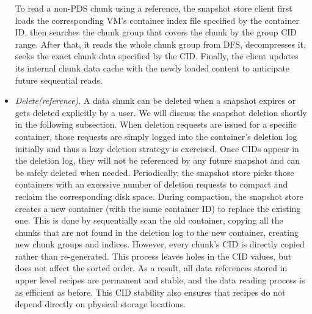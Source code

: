 \begin{itemize}
To read a non-PDS chunk using a reference,  the snapshot store client first loads the
corresponding VM's container index file specified by the container ID, then searches the chunk
group  that  covers the chunk by the group  CID range.
After that, it reads the whole chunk group from DFS, decompresses it, seeks the exact chunk data 
specified by the CID. 
Finally, the client updates its internal chunk data cache with the newly loaded content to 
anticipate future sequential reads.
\item {\em Delete(reference)}.
A data chunk can be deleted when a snapshot expires or gets deleted explicitly by a user.
We will discuss the snapshot deletion shortly in the following subsection.
When deletion requests are issued for a specific container,
those requests are simply logged into the  container's deletion log initially and thus  a lazy
deletion strategy is exercised.
Once CIDs appear in
the deletion log, they will not be referenced by any future snapshot and can be safely deleted when needed. 
Periodically, the snapshot  store picks those containers with an excessive
number of deletion requests to  compact and  reclaim the corresponding disk space. 
During compaction, the snapshot store creates a new container (with the same container ID) to replace the 
existing one. This is done by sequentially scan the old container, copying all the chunks that are not 
found in the deletion log to the new container, creating new chunk groups and indices. 
However, every chunk's CID is directly copied rather than re-generated. This
process leaves holes in the CID values, but does not affect the sorted order.
As a result, all data references stored 
in upper level recipes are permanent and stable, and the data reading process
is as efficient as before. This CID stability also ensures that recipes do not
depend directly on physical storage locations.
\end{itemize}

%

